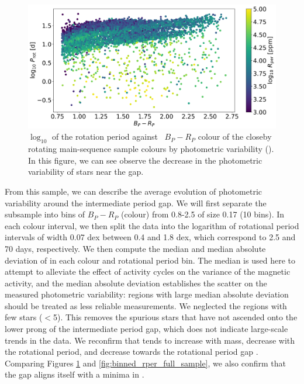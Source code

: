 \begin{figure}
\centering
  \includegraphics[width=\textwidth]{Figures/rot_gap_figures/rotational_dist.png}
  \caption[$\log_{10}$ of the rotation period against \GDRT\ $B_P-R_P$ colour of the closeby rotating main-sequence sample colours by photometric variability (\rper{}).]{
  $\log_{10}$ of the rotation period against \GDRT\ $B_P-R_P$ colour of the closeby rotating main-sequence sample colours by photometric variability (\rper{}). 
In this figure, we can see observe the decrease in the photometric variability of stars near the gap.}
  \label{fig:prawn}
\end{figure}

From this sample, we can describe the average evolution of photometric variability around the intermediate period gap.
We will first separate the subsample into bins of $B_P - R_P$ (colour) from 0.8-2.5 of size 0.17 (10 bins).
In each colour interval, we then split the data into the logarithm of rotational period intervals of width 0.07 dex between 0.4 and 1.8 dex, which correspond to 2.5 and 70 days, respectively.
We then compute the median and median absolute deviation of \rper{} in each colour and rotational period bin.
The median is used here to attempt to alleviate the effect of activity cycles on the variance of the magnetic activity, and the median absolute deviation establishes the scatter on the measured photometric variability: regions with large median absolute deviation should be treated as less reliable measurements.
We neglected the regions with few stars ($<$5).
This removes the spurious stars that have not ascended onto the lower prong of the intermediate period gap, which does not indicate large-scale trends in the data.
We reconfirm that \rper{} tends to increase with mass, decrease with the rotational period, and decrease towards the rotational period gap \citep{reinhold_stellar_2020, basri_double_2018, santos_surface_2021}.
Comparing Figures \ref{fig:prawn} and \ref{fig:binned_rper_full_sample}, we also confirm that the gap aligns itself with a minima in \rper{}.

